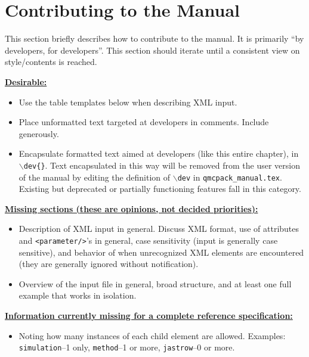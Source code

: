 
\chapter{Contributing to the Manual}
\label{chap:contrib}

This section briefly describes how to contribute to the manual.  It is primarily ``by developers, for developers''.   This section should iterate until a consistent view on style/contents is reached.

\textbf{\underline{Desirable:}}
\begin{itemize}
  \item{Use the table templates below when describing XML input.}
  \item{Place unformatted text targeted at developers in comments.  Include generously.}  
  \item{Encapsulate formatted text aimed at developers (like this entire chapter), in $\backslash$\texttt{dev\{\}}.  Text encapsulated in this way will be removed from the user version of the manual by editing the definition of $\backslash$\texttt{dev} in \texttt{qmcpack\_manual.tex}.  Existing but deprecated or partially functioning features fall in this category.}
\end{itemize}


\textbf{\underline{Missing sections (these are opinions, not decided priorities):}}
\begin{itemize}
  \item{Description of XML input in general.  Discuss XML format, use of attributes and \texttt{<parameter/>}'s in general, case sensitivity (input is generally case sensitive), and behavior of \qmcpack when unrecognized XML elements are encountered (they are generally ignored without notification).}
  \item{Overview of the input file in general, broad structure, and at least one full example that works in isolation.}
\end{itemize}


\textbf{\underline{Information currently missing for a complete reference specification:}}
\begin{itemize}
  \item{Noting how many instances of each child element are allowed.  Examples: \texttt{simulation}--1 only, \texttt{method}--1 or more, \texttt{jastrow}--0 or more}.
\end{itemize}


